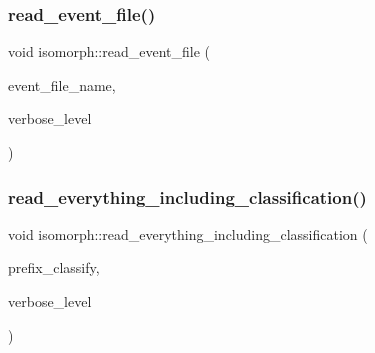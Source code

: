 \mbox{\label{classisomorph_a1dd2cbd2f5012b30f0d4bddf6f8cad2f}} 
\subsubsection{\texorpdfstring{read\+\_\+event\+\_\+file()}{read\_event\_file()}}
{\footnotesize\ttfamily void isomorph\+::read\+\_\+event\+\_\+file (\begin{DoxyParamCaption}\item[{const \mbox{\hyperlink{galois_8h_ab6cc7b4aeb6ea31aba2b3fbfc83ff5e6}{B\+Y\+TE}} $\ast$}]{event\+\_\+file\+\_\+name,  }\item[{\mbox{\hyperlink{galois_8h_a09fddde158a3a20bd2dcadb609de11dc}{I\+NT}}}]{verbose\+\_\+level }\end{DoxyParamCaption})}

\mbox{\label{classisomorph_aa6a56e4522d3133a6ea65c9ac6de3924}} 
\subsubsection{\texorpdfstring{read\+\_\+everything\+\_\+including\+\_\+classification()}{read\_everything\_including\_classification()}}
{\footnotesize\ttfamily void isomorph\+::read\+\_\+everything\+\_\+including\+\_\+classification (\begin{DoxyParamCaption}\item[{const \mbox{\hyperlink{galois_8h_ab6cc7b4aeb6ea31aba2b3fbfc83ff5e6}{B\+Y\+TE}} $\ast$}]{prefix\+\_\+classify,  }\item[{\mbox{\hyperlink{galois_8h_a09fddde158a3a20bd2dcadb609de11dc}{I\+NT}}}]{verbose\+\_\+level }\end{DoxyParamCaption})}

\mbox{\label{classisomorph_a9e56d23f3f1d73c76945df4157100d1a}} 
